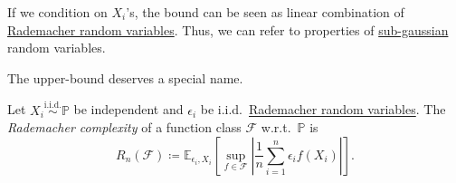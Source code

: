 \begin{intuition}
  If we condition on \(X_i\)'s, the bound can be seen as linear combination of \hyperref[eg:Rademacher-random-varaible]{Rademacher random variables}. Thus, we can refer to properties of \hyperref[def:sub-gaussian]{sub-gaussian} random variables.
\end{intuition}

The upper-bound deserves a special name.

\begin{definition}\label{def:Rademacher-complexity}
  Let \(X_i \overset{\text{i.i.d.} }{\sim } \mathbb{P} \) be independent and \(\epsilon _i\) be i.i.d.\ \hyperref[eg:Rademacher-random-varaible]{Rademacher random variables}. The \emph{Rademacher complexity} of a function class \(\mathscr{F} \) w.r.t.\ \(\mathbb{P} \) is
  \[
    R_n(\mathscr{F} ) \coloneqq \mathbb{E}_{\epsilon _i, X_i}\left[\sup _{f\in \mathscr{F} }\left\vert \frac{1}{n}\sum_{i=1}^{n} \epsilon _i f(X_i) \right\vert  \right] .
  \]
\end{definition}


